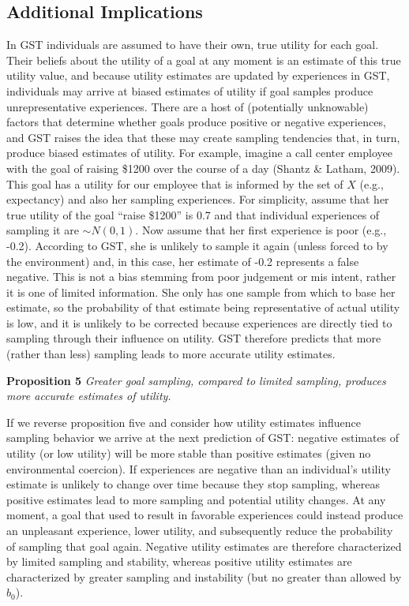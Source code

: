 \documentclass[english,,man]{apa6}
\theoremstyle{definition}
\theoremstyle{definition}
\theoremstyle{definition}
\theoremstyle{remark}
\begin{document}
\hypertarget{additional-implications}{%
\subsection{Additional Implications}\label{additional-implications}}

In GST individuals are assumed to have their own, true utility for each
goal. Their beliefs about the utility of a goal at any moment is an
estimate of this true utility value, and because utility estimates are
updated by experiences in GST, individuals may arrive at biased
estimates of utility if goal samples produce unrepresentative
experiences. There are a host of (potentially unknowable) factors that
determine whether goals produce positive or negative experiences, and
GST raises the idea that these may create sampling tendencies that, in
turn, produce biased estimates of utility. For example, imagine a call
center employee with the goal of raising \$1200 over the course of a day
(Shantz \& Latham, 2009). This goal has a utility for our employee that
is informed by the set of \(X\) (e.g., expectancy) and also her sampling
experiences. For simplicity, assume that her true utility of the goal
\enquote{raise \$1200} is 0.7 and that individual experiences of
sampling it are \(\sim {N}(0,1)\). Now assume that her first experience
is poor (e.g., -0.2). According to GST, she is unlikely to sample it
again (unless forced to by the environment) and, in this case, her
estimate of -0.2 represents a false negative. This is not a bias
stemming from poor judgement or mis intent, rather it is one of limited
information. She only has one sample from which to base her estimate, so
the probability of that estimate being representative of actual utility
is low, and it is unlikely to be corrected because experiences are
directly tied to sampling through their influence on utility. GST
therefore predicts that more (rather than less) sampling leads to more
accurate utility estimates.

\textbf{Proposition 5} \emph{Greater goal sampling, compared to limited
sampling, produces more accurate estimates of utility.}

If we reverse proposition five and consider how utility estimates
influence sampling behavior we arrive at the next prediction of GST:
negative estimates of utility (or low utility) will be more stable than
positive estimates (given no environmental coercion). If experiences are
negative than an individual's utility estimate is unlikely to change
over time because they stop sampling, whereas positive estimates lead to
more sampling and potential utility changes. At any moment, a goal that
used to result in favorable experiences could instead produce an
unpleasant experience, lower utility, and subsequently reduce the
probability of sampling that goal again. Negative utility estimates are
therefore characterized by limited sampling and stability, whereas
positive utility estimates are characterized by greater sampling and
instability (but no greater than allowed by \(b_0\)).
\end{document}

